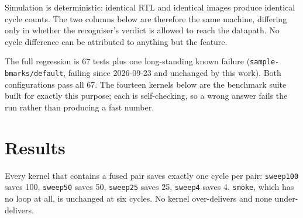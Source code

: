 \documentclass[11pt]{article}
\begin{document}
Simulation is deterministic: identical RTL and identical images produce identical cycle
counts. The two columns below are therefore the same machine, differing only in whether the
recogniser's verdict is allowed to reach the datapath. No cycle difference can be attributed
to anything but the feature.

The full regression is 67 tests plus one long-standing known failure
(\texttt{sample-bmarks/default}, failing since 2026-09-23 and unchanged by this work). Both
configurations pass all 67. The fourteen kernels below are the benchmark suite built for
exactly this purpose; each is self-checking, so a wrong answer fails the run rather than
producing a fast number.

\section{Results}



Every kernel that contains a fused pair saves exactly one cycle per pair: \texttt{sweep100}
saves 100, \texttt{sweep50} saves 50, \texttt{sweep25} saves 25, \texttt{sweep4} saves 4.
\texttt{smoke}, which has no loop at all, is unchanged at six cycles. No kernel over-delivers
and none under-delivers.
\end{document}
